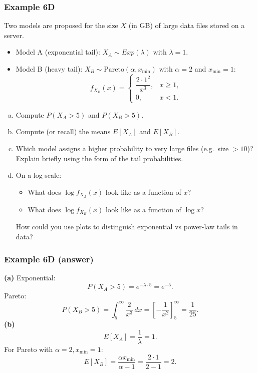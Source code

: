 \documentclass[t,8pt]{beamer}
\begin{document}
\begin{frame}
	\frametitle{Example 6D}
	
	Two models are proposed for the size $X$ (in GB) of large data files
	stored on a server.
	
	\begin{itemize}
		\item Model A (exponential tail): $X_A \sim Exp(\lambda)$ with $\lambda=1$.
		\item Model B (heavy tail): $X_B \sim \text{Pareto}(\alpha, x_{\min})$
		with $\alpha = 2$ and $x_{\min}=1$:
		\[
		f_{X_B}(x) =
		\begin{cases}
			\dfrac{2\cdot 1^2}{x^{3}}, & x \ge 1,\\[4pt]
			0, & x < 1.
		\end{cases}
		\]
	\end{itemize}
	
	\begin{enumerate}[(a)]
		\item Compute $P(X_A > 5)$ and $P(X_B > 5)$.
		\item Compute (or recall) the means $E[X_A]$ and $E[X_B]$.
		\item Which model assigns a higher probability to very large files
		(e.g.\ size $> 10$)? Explain briefly using the form of the tail
		probabilities.
		\item On a log-scale:
		\begin{itemize}
			\item What does $\log f_{X_A}(x)$ look like as a function of $x$?
			\item What does $\log f_{X_B}(x)$ look like as a function of $\log x$?
		\end{itemize}
		How could you use plots to distinguish exponential vs power-law tails
		in data?
	\end{enumerate}
\end{frame}

\begin{frame}
	\frametitle{Example 6D (answer)}
	
	\textbf{(a)} Exponential:
	\[
	P(X_A>5) = e^{-\lambda\cdot 5} = e^{-5}.
	\]
	Pareto:
	\[
	P(X_B>5) = \int_5^\infty \frac{2}{x^3}\,dx
	= \left[-\frac{1}{x^2}\right]_{5}^{\infty}
	= \frac{1}{25}.
	\]
	\textbf{(b)}
	\[
	E[X_A] = \frac{1}{\lambda} = 1.
	\]
	For Pareto with $\alpha=2, x_{\min}=1$:
	\[
	E[X_B] = \frac{\alpha x_{\min}}{\alpha-1}
	= \frac{2\cdot 1}{2-1} = 2.
	\]
	
\end{frame}
\end{document}
